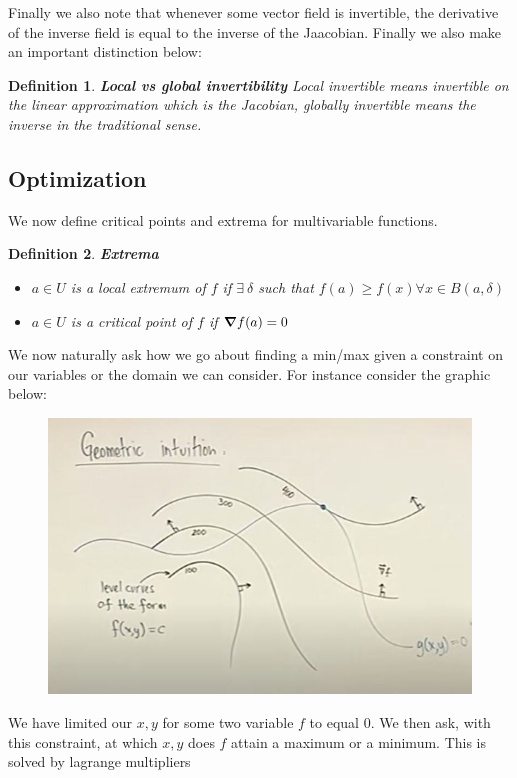 \documentclass[titlepage]{article}
\newtheorem{definition}{Definition}
\begin{document}
Finally we also note that whenever some vector field is invertible, the derivative of the inverse field is equal to the inverse of the Jaacobian. Finally we also make an important distinction below:

\begin{definition} \textbf{Local vs global invertibility}
Local invertible means invertible on the linear approximation which is the Jacobian, globally invertible means the inverse in the traditional sense.
\end{definition}



\subsection{Optimization}
We now define critical points and extrema for multivariable functions.
\begin{definition}\textbf{Extrema}
\begin{itemize}
    \item $a \in U$ is a local extremum of $f$ if $\exists \  \delta $ such that $f(a) \geq f(x) \forall x \in B(a,\delta)$
    \item $a \in U$ is a critical point of $f$ if $\grad f(a) = 0$
\end{itemize}

\end{definition}

We now naturally ask how we go about finding a min/max given a constraint on our variables or the domain we can consider. For instance consider the graphic below:
\begin{figure}[H]
    \centering
    \includegraphics[scale = 0.5]{src/lagIntuition.JPG}
    \label{fig:my_label}
\end{figure}
We have limited our $x,y$ for some two variable $f$ to equal $0$. We then ask, with this constraint, at which $x,y$ does $f$ attain a maximum or a minimum. This is solved by lagrange multipliers
\end{document}
